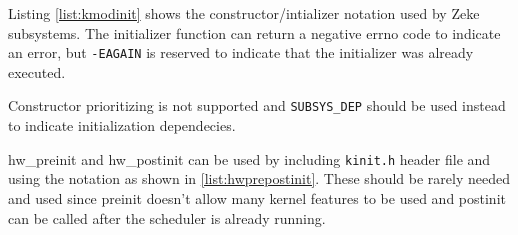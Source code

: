 Listing \ref{list:kmodinit} shows the constructor/intializer notation used by
Zeke subsystems. The initializer function can return a negative errno code
to indicate an error, but \verb+-EAGAIN+ is reserved to indicate that the
initializer was already executed.




Constructor prioritizing is not supported and \verb+SUBSYS_DEP+ should be used
instead to indicate initialization dependecies.


hw\_preinit and hw\_postinit can be used by including \verb+kinit.h+ header file
and using the notation as shown in \ref{list:hwprepostinit}. These should be
rarely needed and used since preinit doesn't allow many kernel features to be
used and postinit can be called after the scheduler is already running.


